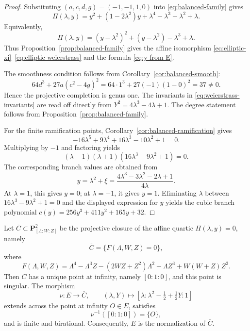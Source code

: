 \begin{proof}
Substituting \((a,c,d,g)=(-1,-1,1,0)\) into \eqref{eq:balanced-family} gives
\begin{equation}\label{eq:Pi-as-quadratic-in-y}
\Pi(\lambda,y)
=
y^2+(1-2\lambda^2)y+\lambda^4-\lambda^3-\lambda^2+\lambda.
\end{equation}
Equivalently,
\[
\Pi(\lambda,y)
=
(y-\lambda^2)^2+(y-\lambda^2)-\lambda^3+\lambda.
\]
Thus Proposition~\ref{prop:balanced-family} gives the affine isomorphism \eqref{eq:elliptic-xi}--\eqref{eq:elliptic-weierstrass} and the formula \eqref{eq:y-from-E}.

The smoothness condition follows from Corollary~\ref{cor:balanced-smooth}:
\[
64d^3+27a(c^2-4g)^2
=
64\cdot 1^3+27(-1)(1-0)^2
=
37\neq 0.
\]
Hence the projective completion is genus one.
The invariants in \eqref{eq:weierstrass-invariants} are read off directly from \(Y^2=4\lambda^3-4\lambda+1\).
The degree statement follows from Proposition~\ref{prop:balanced-family}.

For the finite ramification points, Corollary~\ref{cor:balanced-ramification} gives
\[
-16\lambda^5+9\lambda^4+16\lambda^3-10\lambda^2+1=0.
\]
Multiplying by \(-1\) and factoring yields
\begin{equation}\label{eq:ramification-poly}
(\lambda - 1)(\lambda + 1)(16\lambda^3 - 9\lambda^2 + 1) = 0.
\end{equation}
The corresponding branch values are obtained from
\[
y = \lambda^2 + \xi = \frac{4\lambda^3 - 3\lambda^2 - 2\lambda + 1}{4\lambda}.
\]
At \(\lambda=1\), this gives \(y=0\); at \(\lambda=-1\), it gives \(y=1\).
Eliminating \(\lambda\) between \(16\lambda^3-9\lambda^2+1=0\) and the displayed expression for \(y\) yields the cubic branch polynomial \(c(y)=256y^3+411y^2+165y+32\).
\end{proof}

\begin{lemma}\label{lem:projective-normalization}
Let \(\overline C\subset \mathbf P^2_{[\Lambda:W:Z]}\) be the projective closure of the affine quartic \(\Pi(\lambda,y)=0\), namely
\[
\overline C=\{F(\Lambda,W,Z)=0\},
\]
where
\begin{equation}\label{eq:projective-quartic}
F(\Lambda,W,Z)
=
\Lambda^4-\Lambda^3Z-(2WZ+Z^2)\Lambda^2+\Lambda Z^3+W(W+Z)Z^2.
\end{equation}
Then \(\overline C\) has a unique point at infinity, namely \([0:1:0]\), and this point is singular.
The morphism
\begin{equation}\label{eq:normalization-map}
\nu:E\longrightarrow \overline C,
\qquad
(\lambda,Y)\longmapsto
\left[\lambda:\lambda^2-\tfrac12+\tfrac12Y:1\right]
\end{equation}
extends across the point at infinity \(O\in E\), satisfies
\[
\nu^{-1}([0:1:0])=\{O\},
\]
and is finite and birational.
Consequently, \(E\) is the normalization of \(\overline C\).
\end{lemma}

